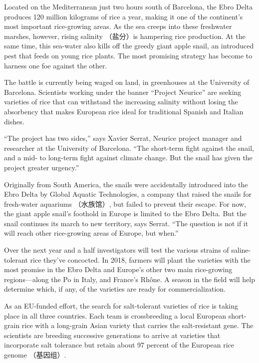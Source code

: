\documentclass[UTF8,11pt]{ctexart}
\begin{document}
Located on the Mediterranean just two hours south of Barcelona, the Ebro Delta produces 120 million kilograms of rice a year, making it one of the continent’s most important rice-growing areas. As the sea creeps into these freshwater marshes, however, rising salinity （盐分）is hampering rice production. At the same time, this sea-water also kills off the greedy giant apple snail, an introduced pest that feeds on young rice plants. The most promising strategy has become to harness one foe against the other.


The battle is currently being waged on land, in greenhouses at the University of Barcelona. Scientists working under the banner “Project Neurice” are seeking varieties of rice that can withstand the increasing salinity without losing the absorbency that makes European rice ideal for traditional Spanish and Italian dishes.


“The project has two sides,” says Xavier Serrat, Neurice project manager and researcher at the University of Barcelona. “The short-term fight against the snail, and a mid- to long-term fight against climate change. But the snail has given the project greater urgency.”


Originally from South America, the snails were accidentally introduced into the Ebro Delta by Global Aquatic Technologies, a company that raised the snails for fresh-water aquariums （水族馆）, but failed to prevent their escape. For now, the giant apple snail’s foothold in Europe is limited to the Ebro Delta. But the snail continues its march to new territory, says Serrat. “The question is not if it will reach other rice-growing areas of Europe, but when.”


Over the next year and a half investigators will test the various strains of saline-tolerant rice they’ve concocted. In 2018, farmers will plant the varieties with the most promise in the Ebro Delta and Europe’s other two main rice-growing regions—along the Po in Italy, and France’s Rhône. A season in the field will help determine which, if any, of the varieties are ready for commercialization.


As an EU-funded effort, the search for salt-tolerant varieties of rice is taking place in all three countries. Each team is crossbreeding a local European short-grain rice with a long-grain Asian variety that carries the salt-resistant gene. The scientists are breeding successive generations to arrive at varieties that incorporate salt tolerance but retain about 97 percent of the European rice genome （基因组）.
\end{document}
